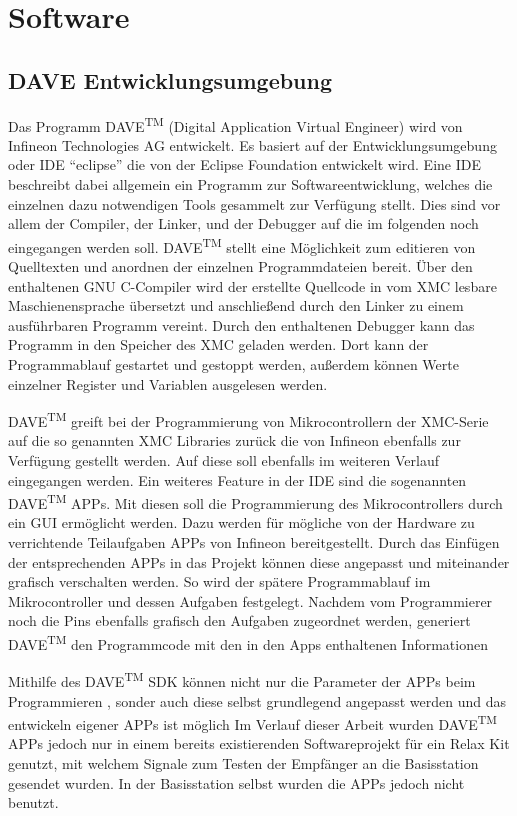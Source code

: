 \chapter{Software}
\label{sec:Software}
\pagestyle{scrheadings}
\section{DAVE Entwicklungsumgebung}

Das Programm DAVE\textsuperscript{TM} (Digital Application Virtual Engineer) wird von Infineon Technologies AG entwickelt. Es basiert auf der Entwicklungsumgebung oder \ac{IDE} \enquote{eclipse} die von der Eclipse Foundation entwickelt wird. Eine \ac{IDE} beschreibt dabei allgemein ein Programm zur Softwareentwicklung, welches die einzelnen dazu notwendigen Tools gesammelt zur Verfügung stellt. Dies sind vor allem der Compiler, der Linker, und der Debugger auf die im folgenden noch eingegangen werden soll. DAVE\textsuperscript{TM} stellt eine Möglichkeit zum editieren von Quelltexten und anordnen der einzelnen Programmdateien bereit. Über den enthaltenen GNU C-Compiler wird der erstellte Quellcode in vom XMC lesbare Maschienensprache übersetzt und anschließend durch den Linker zu einem ausführbaren Programm vereint. Durch den enthaltenen Debugger kann das Programm in den Speicher des XMC geladen werden. Dort kann der Programmablauf gestartet und gestoppt werden, außerdem können Werte einzelner Register und Variablen ausgelesen werden. 

DAVE\textsuperscript{TM} greift bei der Programmierung von Mikrocontrollern der XMC-Serie auf die so genannten XMC Libraries zurück die von Infineon ebenfalls zur Verfügung gestellt werden.  Auf diese soll ebenfalls im weiteren Verlauf  eingegangen werden. Ein weiteres Feature in der \ac{IDE} sind die sogenannten DAVE\textsuperscript{TM} APPs. Mit diesen soll die Programmierung des Mikrocontrollers durch ein \ac{GUI} ermöglicht werden. Dazu werden für  mögliche von der Hardware zu verrichtende Teilaufgaben APPs von Infineon bereitgestellt. Durch das Einfügen der entsprechenden APPs in das Projekt können diese angepasst und miteinander grafisch verschalten werden. So wird der spätere Programmablauf im Mikrocontroller und dessen Aufgaben festgelegt. Nachdem vom Programmierer noch die Pins ebenfalls grafisch den Aufgaben zugeordnet werden, generiert  DAVE\textsuperscript{TM}  den Programmcode mit den in den Apps enthaltenen Informationen%

Mithilfe des DAVE\textsuperscript{TM} \ac{SDK} können nicht nur die Parameter der APPs beim Programmieren , sonder auch diese selbst grundlegend angepasst werden und das entwickeln eigener APPs ist möglich%
Im Verlauf dieser Arbeit wurden DAVE\textsuperscript{TM}  APPs jedoch nur in einem bereits existierenden Softwareprojekt für ein Relax Kit genutzt, mit welchem  Signale zum Testen der Empfänger an die Basisstation gesendet wurden. In der Basisstation selbst wurden die APPs jedoch nicht benutzt.


